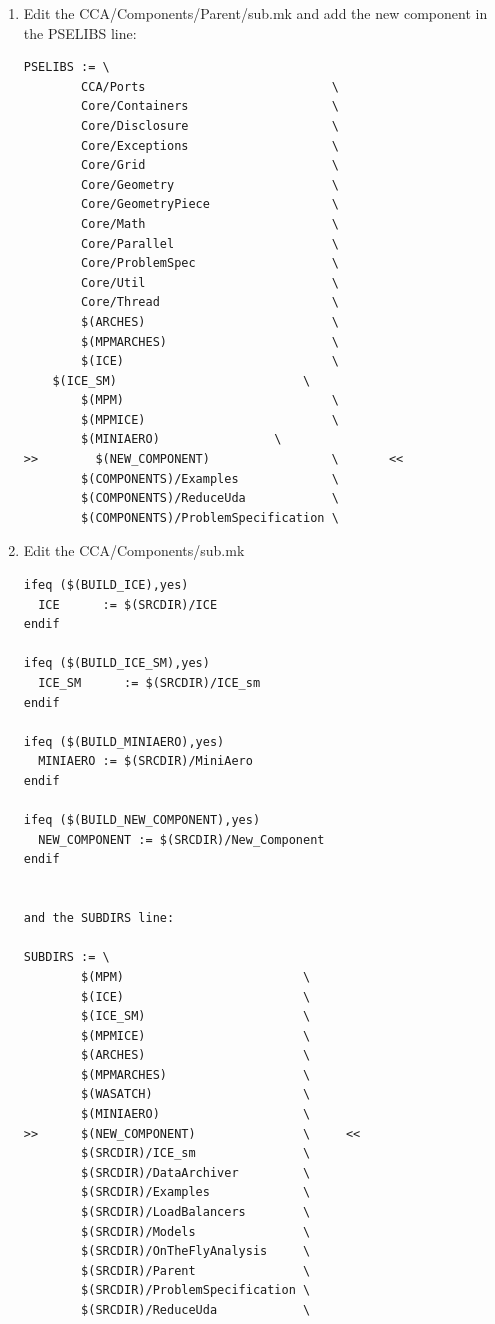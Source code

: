 \documentclass[12pt]{report}
\begin{document}
\begin{enumerate}
\item  Edit the CCA/Components/Parent/sub.mk and add the new component
  in the PSELIBS line:
\begin{verbatim}
PSELIBS := \
        CCA/Ports                          \
        Core/Containers                    \
        Core/Disclosure                    \
        Core/Exceptions                    \
        Core/Grid                          \
        Core/Geometry                      \
        Core/GeometryPiece                 \
        Core/Math                          \
        Core/Parallel                      \
        Core/ProblemSpec                   \
        Core/Util                          \
        Core/Thread                        \
        $(ARCHES)                          \
        $(MPMARCHES)                       \
        $(ICE)                             \
	$(ICE_SM)                          \
        $(MPM)                             \
        $(MPMICE)                          \
        $(MINIAERO)		           \
>>        $(NEW_COMPONENT)                 \       <<
        $(COMPONENTS)/Examples             \
        $(COMPONENTS)/ReduceUda            \
        $(COMPONENTS)/ProblemSpecification \
\end{verbatim}

\item Edit the CCA/Components/sub.mk

\begin{verbatim}
ifeq ($(BUILD_ICE),yes)
  ICE      := $(SRCDIR)/ICE
endif

ifeq ($(BUILD_ICE_SM),yes)
  ICE_SM      := $(SRCDIR)/ICE_sm
endif

ifeq ($(BUILD_MINIAERO),yes)
  MINIAERO := $(SRCDIR)/MiniAero
endif

ifeq ($(BUILD_NEW_COMPONENT),yes)
  NEW_COMPONENT := $(SRCDIR)/New_Component
endif


and the SUBDIRS line:

SUBDIRS := \
        $(MPM)                         \
        $(ICE)                         \
        $(ICE_SM)                      \
        $(MPMICE)                      \
        $(ARCHES)                      \
        $(MPMARCHES)                   \
        $(WASATCH)                     \
        $(MINIAERO)                    \
>>      $(NEW_COMPONENT)               \     <<
        $(SRCDIR)/ICE_sm               \
        $(SRCDIR)/DataArchiver         \
        $(SRCDIR)/Examples             \
        $(SRCDIR)/LoadBalancers        \
        $(SRCDIR)/Models               \
        $(SRCDIR)/OnTheFlyAnalysis     \
        $(SRCDIR)/Parent               \
        $(SRCDIR)/ProblemSpecification \
        $(SRCDIR)/ReduceUda            \
\end{verbatim}


\end{enumerate}
\end{document}
